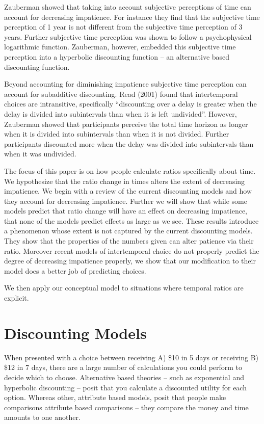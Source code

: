 \documentclass[]{article}
\begin{document}
Zauberman showed that taking into account subjective perceptions of time can account for decreasing impatience. 
For instance they find that the subjective time perception of 1 year is not different from the subjective time perception of 3 years. 
Further subjective time perception was shown to follow a psychophysical logarithmic function. Zauberman, however, embedded this subjective time perception into a hyperbolic discounting function – an alternative based discounting function.  

Beyond accounting for diminishing impatience subjective time perception can account for subadditive discounting. 
Read (2001) found that intertemporal choices are intransitive, specifically “discounting over a delay is greater when the delay is divided into subintervals than when it is left undivided”. 
However, Zauberman showed that participants perceive the total time horizon as longer when it is divided into subintervals than when it is not divided. 
Further participants discounted more when the delay was divided into subintervals than when it was undivided. 

The focus of this paper is on how people calculate ratios specifically about time. 
We hypothesize that the ratio change in times alters the extent of decreasing impatience. 
We begin with a review of the current discounting models and how they account for decreasing impatience. 
Further we will show that while some models predict that ratio change will have an effect on decreasing impatience, that none of the models predict effects as large as we see. 
These results introduce a phenomenon whose extent is not captured by the current discounting models. 
They show that the properties of the numbers given can alter patience via their ratio. 
Moreover recent models of intertemporal choice do not properly predict the degree of decreasing impatience properly, we show that our modification to their model does a better job of predicting choices. 

We then apply our conceptual model to situations where temporal ratios are explicit. 


\section{Discounting Models}

When presented with a choice between receiving A) \$10 in 5 days or receiving B) \$12 in 7 days, there are a large number of calculations you could perform to decide which to choose.  Alternative based theories -- such as exponential and hyperbolic discounting -- posit that you calculate a discounted utility for each option. Whereas other, attribute based models, posit that people make comparisons attribute based comparisons -- they compare the money and time amounts to one another. 
\end{document}
